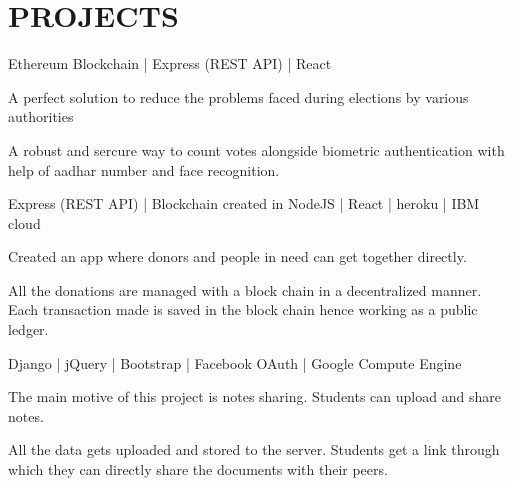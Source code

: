 \documentclass[]{deedy-resume-openfont}
\begin{document}
\hfill
\begin{minipage}[t]{0.66\textwidth} 


\section{PROJECTS}
\vspace{\topsep}
\vspace{\topsep}
\begin{tightemize}
\item Ethereum Blockchain | Express (REST API) | React
\item A perfect solution to reduce the problems faced during elections by various authorities
\item A robust and sercure way to count votes alongside biometric authentication with help of aadhar number and face recognition.
\end{tightemize}
\sectionsep

\vspace{\topsep} %
\begin{tightemize}
\item Express (REST API) | Blockchain created in NodeJS | React | heroku | IBM cloud
\item Created an app where donors and people in need can get together directly.
\item All the donations are managed with a block chain in a decentralized manner. Each transaction made is saved in the block chain hence working as a public ledger.
\end{tightemize}
\sectionsep

\begin{tightemize}
\item Django | jQuery | Bootstrap | Facebook OAuth | Google Compute Engine
\item The main motive of this project is notes sharing. Students can upload and share notes.
\item All the data gets uploaded and stored to the server. Students get a link through which they can directly share the documents with their peers.
\end{tightemize}
\sectionsep


\end{minipage}
\end{document}
